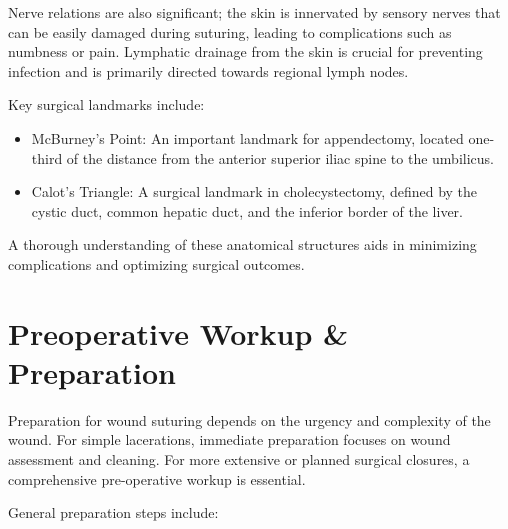 Nerve relations are also significant; the skin is innervated by sensory nerves that can be easily damaged during suturing, leading to complications such as numbness or pain. Lymphatic drainage from the skin is crucial for preventing infection and is primarily directed towards regional lymph nodes.

Key surgical landmarks include:

\begin{itemize}
  \item McBurney's Point: An important landmark for appendectomy, located one-third of the distance from the anterior superior iliac spine to the umbilicus.
  \item Calot's Triangle: A surgical landmark in cholecystectomy, defined by the cystic duct, common hepatic duct, and the inferior border of the liver.
\end{itemize}

A thorough understanding of these anatomical structures aids in minimizing complications and optimizing surgical outcomes.

\section*{Preoperative Workup \& Preparation}
Preparation for wound suturing depends on the urgency and complexity of the wound. For simple lacerations, immediate preparation focuses on wound assessment and cleaning. For more extensive or planned surgical closures, a comprehensive pre-operative workup is essential.

General preparation steps include:


